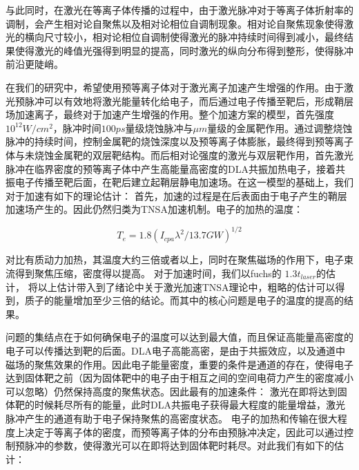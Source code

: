 与此同时，在激光在等离子体传播的过程中，由于激光脉冲对于等离子体折射率的调制，会产生相对论自聚焦以及相对论相位自调制现象。相对论自聚焦现象使得激光的横向尺寸较小，相对论相位自调制使得激光的脉冲持续时间得到减小，最终结果使得激光的峰值光强得到明显的提高，同时激光的纵向分布得到整形，使得脉冲前沿更陡峭\cite{wanghongyong}。

在我们的研究中，希望使用预等离子体对于激光离子加速产生增强的作用。由于激光预脉冲可以有效地将激光能量转化给电子，而后通过电子传播至靶后，形成鞘层场加速离子，最终对于加速产生增强的作用。整个加速方案的模型，首先强度$10^{12}W/cm^2$，脉冲时间$100ps$量级烧蚀脉冲与$\mu m$量级的金属靶作用。通过调整烧蚀脉冲的持续时间，控制金属靶的烧蚀深度以及预等离子体膨胀，最终得到预等离子体与未烧蚀金属靶的双层靶结构。而后相对论强度的激光与双层靶作用，首先激光脉冲在临界密度的预等离子体中产生高能量高密度的DLA共振加热电子，接着共振电子传播至靶后面，在靶后建立起鞘层静电加速场。在这一模型的基础上，我们对于加速有如下的理论估计：
首先，加速的过程是在后表面由于电子产生的鞘层加速场产生的。因此仍然归类为TNSA加速机制。电子的加热的温度：

\begin{equation}
\label{eqn:DLAtemperature}
T_e = 1.8(I_{cpa} {\lambda}^2/{13.7}GW)^{1/2}
\end{equation} 



对比有质动力加热，其温度大约三倍或者以上，同时在聚焦磁场的作用下，电子束流得到聚焦压缩，密度得以提高。
对于加速时间，我们以fuchs的 $1.3 t_{laser}$的估计， 将以上估计带入到了绪论中关于激光加速TNSA理论中，粗略的估计可以得到，质子的能量增加至少三倍的结论。而其中的核心问题是电子的温度的提高的结果。


问题的集结点在于如何确保电子的温度可以达到最大值，而且保证高能量高密度的电子可以传播达到靶的后面。DLA电子高能高密，是由于共振效应，以及通道中磁场的聚焦效果的作用。因此电子能量密度，重要的条件是通道的存在，使得电子达到固体靶之前（因为固体靶中的电子由于相互之间的空间电荷力产生的密度减小可以忽略）仍然保持高度的聚焦状态。因此最有的加速条件：
激光在即将达到固体靶的时候耗尽所有的能量，此时DLA共振电子获得最大程度的能量增益，激光脉冲产生的通道有助于电子保持聚焦的高密度状态。
电子的加热和传输在很大程度上决定于等离子体的密度，而预等离子体的分布由预脉冲决定，因此可以通过控制预脉冲的参数，使得激光可以在即将达到固体靶时耗尽。对此我们有如下的估计：




